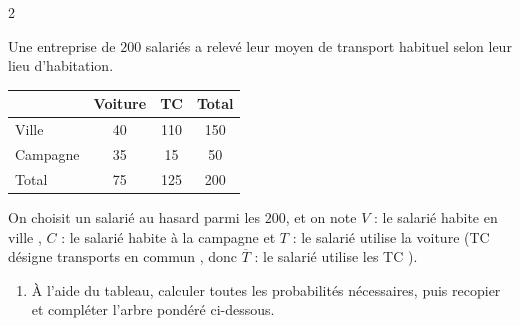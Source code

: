\documentclass[10pt,a4paper]{article}
\begin{document}
\begin{multicols}{2}

\begin{exo}
Une entreprise de \(200\) salariés a relevé leur moyen de transport habituel selon leur lieu d'habitation.

\smallskip

\begin{center}
\begin{tabular}{|l|c|c|c|}
    \hline
     & Voiture & TC & Total \\
    \hline
    Ville & 40 & 110 & 150 \\
    \hline
    Campagne & 35 & 15 & 50 \\
    \hline
    Total & 75 & 125 & 200 \\
    \hline
\end{tabular}
\end{center}

On choisit un salarié au hasard parmi les \(200\), et on note \(V\) : \og le salarié habite en ville \fg{}, \(C\) : \og le salarié habite à la campagne \fg{} et \(T\) : \og le salarié utilise la voiture \fg{} (TC désigne \og transports en commun \fg{}, donc \(\overline{T}\) : \og le salarié utilise les TC \fg{}).

\begin{enumerate}[leftmargin=*]
    \item À l'aide du tableau, calculer toutes les probabilités nécessaires, puis recopier et compléter l'arbre pondéré ci-dessous.

    \smallskip


\end{enumerate}
\end{exo}
\end{multicols}
\end{document}
